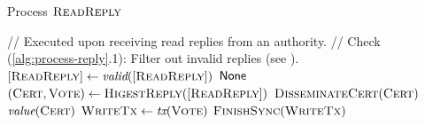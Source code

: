 \begin{algorithm}[t]
    \caption{Process $\textsc{ReadReply}$}
    \label{alg:process-reply}
    \small
    \begin{algorithmic}[1]

        \Statex
        \Statex // Executed upon receiving read replies from an authority.
        \State // Check (\ref{alg:process-reply}.1): Filter out invalid replies (see ).
        \State $[\textsc{ReadReply}] \gets \emph{valid}([\textsc{ReadReply}])$
        \State
        \If{$![\reply]$} 
        \State \Return $\textsf{None}$ \label{alg:line:read_none}
        \EndIf
        \State
        \State $(\cert, \vote) \gets \Call{HigestReply}{[\reply]}$ \label{alg:line:search_highest}
        \If{$\cert \geq \vote$}
        \State $\Call{DisseminateCert}{\cert}$  \label{alg:line:disseminate_cert}
        \State \Return $\emph{value}(\textsc{Cert})$ \label{alg:line:read_cert}
        \Else
        \State $\textsc{WriteTx} \gets \emph{tx}(\textsc{Vote})$
        \State \Return $\Call{FinishSync}{\tx}$  \label{alg:line:finishg_sync}
        \EndIf
        \EndProcedure
    \end{algorithmic}
\end{algorithm}




